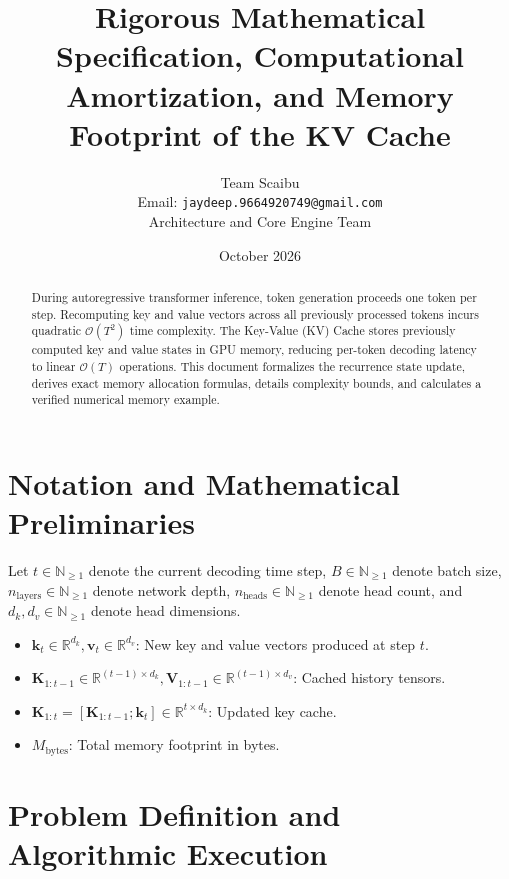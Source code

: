 \documentclass[11pt,a4paper]{article}
\title{\textbf{Rigorous Mathematical Specification, Computational Amortization, and Memory Footprint of the KV Cache}}
\author{Team Scaibu \\ \small Email: \texttt{jaydeep.9664920749@gmail.com} \\ \small Architecture and Core Engine Team}
\date{October 2026}
\theoremstyle{definition}
\begin{document}
\maketitle

\begin{abstract}
During autoregressive transformer inference, token generation proceeds one token per step. Recomputing key and value vectors across all previously processed tokens incurs quadratic $\mathcal{O}(T^2)$ time complexity. The Key-Value (KV) Cache stores previously computed key and value states in GPU memory, reducing per-token decoding latency to linear $\mathcal{O}(T)$ operations. This document formalizes the recurrence state update, derives exact memory allocation formulas, details complexity bounds, and calculates a verified numerical memory example.
\end{abstract}

\section{Notation and Mathematical Preliminaries}

Let $t \in \mathbb{N}_{\ge 1}$ denote the current decoding time step, $B \in \mathbb{N}_{\ge 1}$ denote batch size, $n_{\text{layers}} \in \mathbb{N}_{\ge 1}$ denote network depth, $n_{\text{heads}} \in \mathbb{N}_{\ge 1}$ denote head count, and $d_k, d_v \in \mathbb{N}_{\ge 1}$ denote head dimensions.

\begin{itemize}
    \item $\mathbf{k}_t \in \mathbb{R}^{d_k}, \mathbf{v}_t \in \mathbb{R}^{d_v}$: New key and value vectors produced at step $t$.
    \item $\mathbf{K}_{1:t-1} \in \mathbb{R}^{(t-1) \times d_k}, \mathbf{V}_{1:t-1} \in \mathbb{R}^{(t-1) \times d_v}$: Cached history tensors.
    \item $\mathbf{K}_{1:t} = [\mathbf{K}_{1:t-1}; \mathbf{k}_t] \in \mathbb{R}^{t \times d_k}$: Updated key cache.
    \item $M_{\text{bytes}}$: Total memory footprint in bytes.
\end{itemize}

\section{Problem Definition and Algorithmic Execution}
\end{document}
